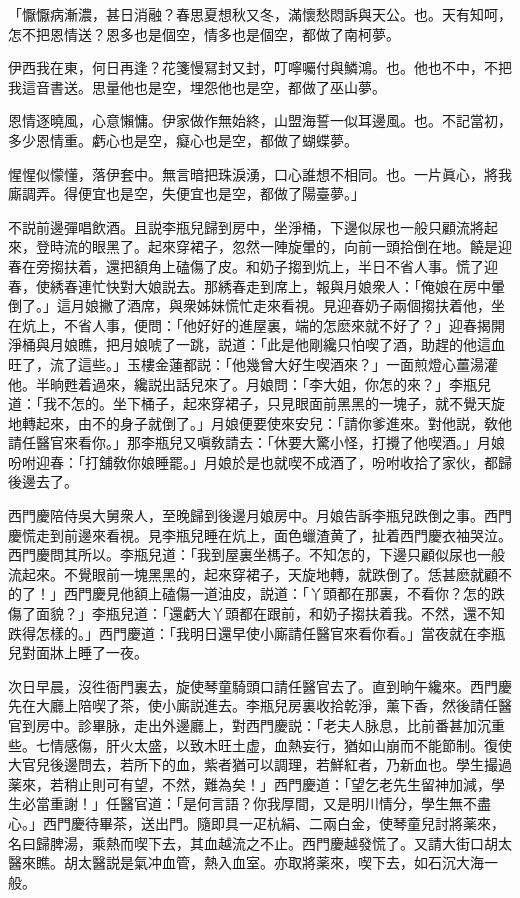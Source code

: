 \begin{myquote}
「懨懨病漸濃，甚日消融？春思夏想秋又冬，滿懷愁悶訴與天公。也。天有知呵，怎不把恩情送？恩多也是個空，情多也是個空，都做了南柯夢。

伊西我在東，何日再逢？花箋慢冩封又封，叮嚀囑付與鱗鴻。也。他也不中，不把我這音書送。思量他也是空，埋怨他也是空，都做了巫山夢。

恩情逐曉風，心意懶慵。伊家做作無始終，山盟海誓一似耳邊風。也。不記當初，多少恩情重。虧心也是空，癡心也是空，都做了蝴蝶夢。

惺惺似懞懂，落伊套中。無言暗把珠淚湧，口心誰想不相同。也。一片眞心，將我廝調弄。得便宜也是空，失便宜也是空，都做了陽臺夢。」
\end{myquote}

不説前邊彈唱飲酒。且説李瓶兒歸到房中，坐淨桶，下邊似尿也一般只顧流將起來，登時流的眼黑了。起來穿裙子，忽然一陣旋暈的，向前一頭拾倒在地。饒是迎春在旁搊扶着，還把額角上磕傷了皮。和奶子搊到炕上，半日不省人事。慌了迎春，使綉春連忙快對大娘説去。那綉春走到席上，報與月娘衆人：「俺娘在房中暈倒了。」這月娘撇了酒席，與衆姊妹慌忙走來看視。見迎春奶子兩個搊扶着他，坐在炕上，不省人事，便問：「他好好的進屋裏，端的怎麽來就不好了？」迎春揭開淨桶與月娘瞧，把月娘唬了一跳，説道：「此是他剛纔只怕喫了酒，助趕的他這血旺了，流了這些。」玉樓金蓮都説：「他幾曾大好生喫酒來？」一面煎燈心薑湯灌他。半晌甦着過來，纔説出話兒來了。月娘問：「李大姐，你怎的來？」李瓶兒道：「我不怎的。坐下桶子，起來穿裙子，只見眼面前黑黑的一塊子，就不覺天旋地轉起來，由不的身子就倒了。」月娘便要使來安兒：「請你爹進來。對他説，敎他請任醫官來看你。」那李瓶兒又嗔敎請去：「休要大驚小怪，打攪了他喫酒。」月娘吩咐迎春：「打舖敎你娘睡罷。」月娘於是也就喫不成酒了，吩咐收拾了家伙，都歸後邊去了。

西門慶陪侍吳大舅衆人，至晚歸到後邊月娘房中。月娘告訴李瓶兒跌倒之事。西門慶慌走到前邊來看視。見李瓶兒睡在炕上，面色蠟渣黄了，扯着西門慶衣袖哭泣。西門慶問其所以。李瓶兒道：「我到屋裏坐榪子。不知怎的，下邊只顧似尿也一般流起來。不覺眼前一塊黑黑的，起來穿裙子，天旋地轉，就跌倒了。恁甚麽就顧不的了！」西門慶見他額上磕傷一道油皮，説道：「丫頭都在那裏，不看你？怎的跌傷了面貌？」李瓶兒道：「還虧大丫頭都在跟前，和奶子搊扶着我。不然，還不知跌得怎樣的。」西門慶道：「我明日還早使小廝請任醫官來看你看。」當夜就在李瓶兒對面牀上睡了一夜。

次日早晨，沒徃衙門裏去，旋使琴童騎頭口請任醫官去了。直到晌午纔來。西門慶先在大廳上陪喫了茶，使小廝説進去。李瓶兒房裏收拾乾淨，薰下香，然後請任醫官到房中。診畢脉，走出外邊廳上，對西門慶説：「老夫人脉息，比前番甚加沉重些。七情感傷，肝火太盛，以致木旺土虚，血熱妄行，猶如山崩而不能節制。復使大官兒後邊問去，若所下的血，紫者猶可以調理，若鮮紅者，乃新血也。學生撮過薬來，若稍止則可有望，不然，難為矣！」西門慶道：「望乞老先生留神加減，學生必當重謝！」任醫官道：「是何言語？你我厚間，又是明川情分，學生無不盡心。」西門慶待畢茶，送出門。隨即具一疋杭絹、二兩白金，使琴童兒討將薬來，名曰歸脾湯，乘熱而喫下去，其血越流之不止。西門慶越發慌了。又請大街口胡太醫來瞧。胡太醫説是氣冲血管，熱入血室。亦取將薬來，喫下去，如石沉大海一般。

